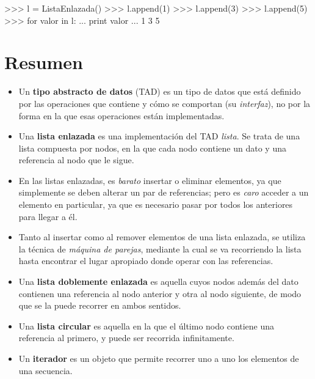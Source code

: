\begin{codigo-python-sn}
>>> l = ListaEnlazada()
>>> l.append(1)
>>> l.append(3)
>>> l.append(5)
>>> for valor in l:
...     print valor
...
1
3
5
\end{codigo-python-sn}

\section{Resumen}

\begin{itemize}

\item Un {\bf tipo abstracto de datos} (TAD) es un tipo de datos que está
definido por las operaciones que contiene y cómo se comportan (su {\it
interfaz}), no por la forma en la que esas operaciones están implementadas.

\item Una {\bf lista enlazada} es una implementación del TAD {\it lista}.
Se trata de una lista compuesta por nodos, en la que
cada nodo contiene un dato y una referencia al nodo que le sigue.

\item En las listas enlazadas, es {\it barato} insertar o eliminar
elementos, ya que simplemente se deben alterar un par de referencias; pero
es {\it caro} acceder a un elemento en particular, ya que es necesario
pasar por todos los anteriores para llegar a él.

\item Tanto al insertar como al remover elementos de una lista enlazada, se
utiliza la técnica de {\it máquina de parejas}, mediante la cual se va
recorriendo la lista hasta encontrar el lugar apropiado donde operar con
las referencias.

\item Una {\bf lista doblemente enlazada} es aquella cuyos nodos además del
dato contienen una referencia al nodo anterior y otra al nodo siguiente, de
modo que se la puede recorrer en ambos sentidos.

\item Una {\bf lista circular} es aquella en la que el último nodo contiene
una referencia al primero, y puede ser recorrida infinitamente.

\item Un {\bf iterador} es un objeto que permite recorrer uno a uno los
elementos de una secuencia.

\end{itemize}


